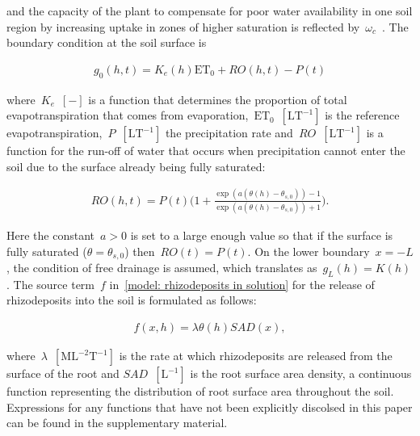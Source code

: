 \documentclass[11pt,a4paper]{article}
\numberwithin{equation}{section}
\begin{document}
and the capacity of the plant to compensate for poor water availability in one soil region by increasing uptake in zones of higher saturation is reflected by~$\omega_c$~\citep{cai2018parameterization}. The boundary condition at the soil surface is
\begin{linenomath*}
	\begin{equation}\label{model: boundary condition soil surface}
		\begin{aligned}
			g_0(h, t) = K_e(h)\text{ET}_0 + RO(h,t) - P(t) 
		\end{aligned}
	\end{equation}
\end{linenomath*}
where~$K_e$~$[-]$ is a function that determines the proportion of total evapotranspiration that comes from evaporation,~$\text{ET}_0$~$[\text{LT}^{-1}]$ is the reference evapotranspiration,~$P$~$[\text{LT}^{-1}]$ the precipitation rate and~$RO$~$[\text{LT}^{-1}]$ is a function for the run-off of water that occurs when precipitation cannot enter the soil due to the surface already being fully saturated:
\begin{linenomath*}
	\begin{equation}\label{model: runoff function}
		\begin{aligned}
			RO(h,t) = P(t)\Big(1+\frac{\exp(a(\theta(h)-\theta_{s,0})) - 1}{\exp(a(\theta(h)-\theta_{s,0})) + 1}\Big). 
		\end{aligned}
	\end{equation}
\end{linenomath*}
Here the constant~$a>0$ is set to a large enough value so that if the surface is fully saturated ($\theta = \theta_{s, 0}$) then~$RO(t) = P(t)$. On the lower boundary~$x=-L$, the condition of free drainage is assumed, which translates as~$g_L(h) = K(h)$. The source term~$f$ in~\eqref{model: rhizodeposits in solution} for the release of rhizodeposits into the soil is formulated as follows:
\begin{linenomath*}
	\begin{equation}\label{model: rhizodeposit release}
		\begin{aligned}
			f(x,h) = \lambda\theta(h) SAD(x),
		\end{aligned}	
	\end{equation}
\end{linenomath*}
where~$\lambda$~$[\text{M}\text{L}^{-2}\text{T}^{-1}]$ is the rate at which rhizodeposits are released from the surface of the root and $SAD$~$[\text{L}^{-1}]$ is the root surface area density, a continuous function representing the distribution of root surface area throughout the soil. Expressions for any functions that have not been explicitly discolsed in this paper can be found in the supplementary material.
\end{document}
